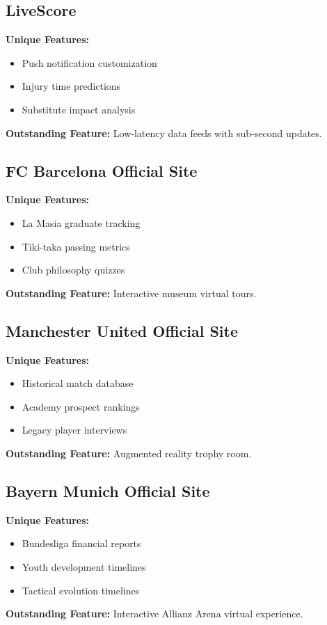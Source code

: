 \subsection{LiveScore}
\textbf{Unique Features:}
\begin{itemize}
    \item Push notification customization
    \item Injury time predictions
    \item Substitute impact analysis
\end{itemize}
\textbf{Outstanding Feature:} Low-latency data feeds with sub-second updates\parencite{livescore}.

\subsection{FC Barcelona Official Site}
\textbf{Unique Features:}
\begin{itemize}
    \item La Masia graduate tracking
    \item Tiki-taka passing metrics
    \item Club philosophy quizzes
\end{itemize}
\textbf{Outstanding Feature:} Interactive museum virtual tours\parencite{fcb}.

\subsection{Manchester United Official Site}
\textbf{Unique Features:}
\begin{itemize}
    \item Historical match database
    \item Academy prospect rankings
    \item Legacy player interviews
\end{itemize}
\textbf{Outstanding Feature:} Augmented reality trophy room\parencite{manutd}.

\subsection{Bayern Munich Official Site}
\textbf{Unique Features:}
\begin{itemize}
    \item Bundesliga financial reports
    \item Youth development timelines
    \item Tactical evolution timelines
\end{itemize}
\textbf{Outstanding Feature:} Interactive Allianz Arena virtual experience\parencite{bayern}.

